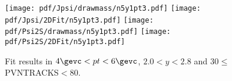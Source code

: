 \begin{figure}[H]
\begin{center}
\texttt{[image: pdf/Jpsi/drawmass/n5y1pt3.pdf]}
\texttt{[image: pdf/Jpsi/2DFit/n5y1pt3.pdf]}
\vspace*{-0.5cm}
\texttt{[image: pdf/Psi2S/drawmass/n5y1pt3.pdf]}
\texttt{[image: pdf/Psi2S/2DFit/n5y1pt3.pdf]}
\vspace*{-0.5cm}
\end{center}
\caption{Fit results in $4\gevc<pt<6\gevc$, $2.0<y<2.8$ and 30$\leq$PVNTRACKS$<$80.}
\label{Fitn5y1pt3}
\end{figure}
